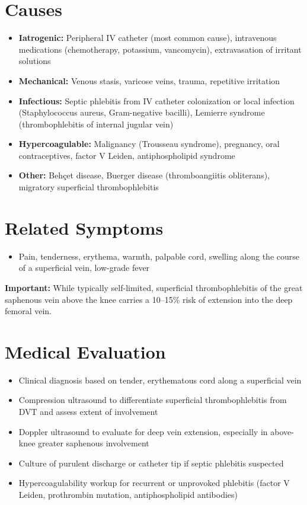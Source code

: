 \section*{Causes}
\begin{itemize}
  \item \textbf{Iatrogenic:} Peripheral IV catheter (most common cause), intravenous medications (chemotherapy, potassium, vancomycin), extravasation of irritant solutions
  \item \textbf{Mechanical:} Venous stasis, varicose veins, trauma, repetitive irritation
  \item \textbf{Infectious:} Septic phlebitis from IV catheter colonization or local infection (Staphylococcus aureus, Gram-negative bacilli), Lemierre syndrome (thrombophlebitis of internal jugular vein)
  \item \textbf{Hypercoagulable:} Malignancy (Trousseau syndrome), pregnancy, oral contraceptives, factor V Leiden, antiphospholipid syndrome
  \item \textbf{Other:} Beh\c{c}et disease, Buerger disease (thromboangiitis obliterans), migratory superficial thrombophlebitis
\end{itemize}

\section*{Related Symptoms}
\begin{itemize}
  \item Pain, tenderness, erythema, warmth, palpable cord, swelling along the course of a superficial vein, low-grade fever
\end{itemize}
\textbf{Important:} While typically self-limited, superficial thrombophlebitis of the great saphenous vein above the knee carries a 10--15\% risk of extension into the deep femoral vein.

\section*{Medical Evaluation}
\begin{itemize}
  \item Clinical diagnosis based on tender, erythematous cord along a superficial vein
  \item Compression ultrasound to differentiate superficial thrombophlebitis from DVT and assess extent of involvement
  \item Doppler ultrasound to evaluate for deep vein extension, especially in above-knee greater saphenous involvement
  \item Culture of purulent discharge or catheter tip if septic phlebitis suspected
  \item Hypercoagulability workup for recurrent or unprovoked phlebitis (factor V Leiden, prothrombin mutation, antiphospholipid antibodies)
\end{itemize}

